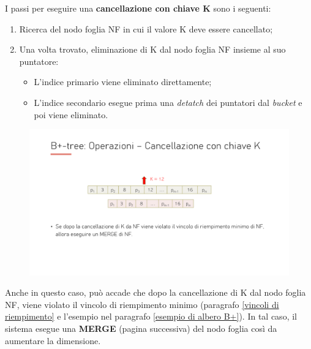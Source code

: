 \documentclass[a4paper]{article}
\begin{document}
	I passi per eseguire una \textcolor{Red3}{\textbf{cancellazione con chiave K}} sono i seguenti:
	\begin{enumerate}
		\item Ricerca del nodo foglia NF in cui il valore K deve essere cancellato;
		
		\item Una volta trovato, eliminazione di K dal nodo foglia NF insieme al suo puntatore:
		\begin{itemize}
			\item L'indice primario viene eliminato direttamente;
			
			\item L'indice secondario esegue prima una \emph{detatch} dei puntatori dal \emph{bucket} e poi viene eliminato.
		\end{itemize}
	\end{enumerate}
	\begin{figure}[!htp]
		\centering
		\includegraphics[width=.7\textwidth]{img/eliminazione-1.pdf}
	\end{figure}
	
	\noindent
	Anche in questo caso, può accade che dopo la cancellazione di K dal nodo foglia NF, viene violato il vincolo di riempimento minimo (paragrafo \ref{vincoli di riempimento} e l'esempio nel paragrafo \ref{esempio di albero B+}). In tal caso, il sistema esegue una \textbf{MERGE} (pagina successiva) del nodo foglia così da aumentare la dimensione.\newpage
	
\end{document}
